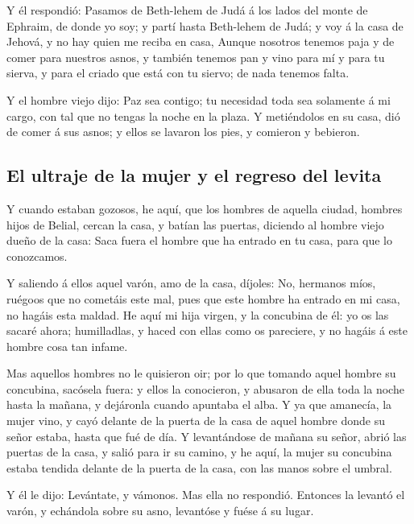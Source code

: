  Y él respondió: Pasamos de Beth-lehem de Judá á los
lados del monte de Ephraim, de donde yo soy; y partí hasta Beth-lehem de
Judá; y voy á la casa de Jehová, y no hay quien me reciba en casa,
 Aunque nosotros tenemos paja y de comer para nuestros
asnos, y también tenemos pan y vino para mí y para tu sierva, y para el
criado que está con tu siervo; de nada tenemos falta.

 Y el hombre viejo dijo: Paz sea contigo; tu necesidad
toda sea solamente á mi cargo, con tal que no tengas la noche en la
plaza.  Y metiéndolos en su casa, dió de comer á sus
asnos; y ellos se lavaron los pies, y comieron y bebieron.

\hypertarget{el-ultraje-de-la-mujer-y-el-regreso-del-levita}{%
\subsection{El ultraje de la mujer y el regreso del
levita}\label{el-ultraje-de-la-mujer-y-el-regreso-del-levita}}

 Y cuando estaban gozosos, he aquí, que los hombres de
aquella ciudad, hombres hijos de Belial, cercan la casa, y batían las
puertas, diciendo al hombre viejo dueño de la casa: Saca fuera el hombre
que ha entrado en tu casa, para que lo conozcamos.

 Y saliendo á ellos aquel varón, amo de la casa, díjoles:
No, hermanos míos, ruégoos que no cometáis este mal, pues que este
hombre ha entrado en mi casa, no hagáis esta maldad.  He
aquí mi hija virgen, y la concubina de él: yo os las sacaré ahora;
humilladlas, y haced con ellas como os pareciere, y no hagáis á este
hombre cosa tan infame.

 Mas aquellos hombres no le quisieron oir; por lo que
tomando aquel hombre su concubina, sacósela fuera: y ellos la
conocieron, y abusaron de ella toda la noche hasta la mañana, y
dejáronla cuando apuntaba el alba.  Y ya que amanecía, la
mujer vino, y cayó delante de la puerta de la casa de aquel hombre donde
su señor estaba, hasta que fué de día.  Y levantándose de
mañana su señor, abrió las puertas de la casa, y salió para ir su
camino, y he aquí, la mujer su concubina estaba tendida delante de la
puerta de la casa, con las manos sobre el umbral.

 Y él le dijo: Levántate, y vámonos. Mas ella no
respondió. Entonces la levantó el varón, y echándola sobre su asno,
levantóse y fuése á su lugar.

